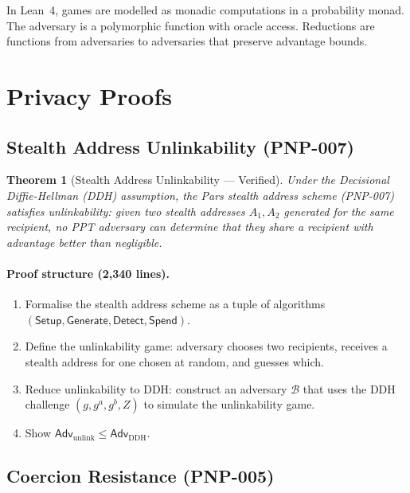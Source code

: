 \documentclass[11pt,a4paper]{article}
\newtheorem{theorem}{Theorem}[section]
\begin{document}
In Lean~4, games are modelled as monadic computations in a probability
monad.  The adversary is a polymorphic function with oracle access.
Reductions are functions from adversaries to adversaries that preserve
advantage bounds.

\section{Privacy Proofs}
\label{sec:privacy}

\subsection{Stealth Address Unlinkability (PNP-007)}

\begin{theorem}[Stealth Address Unlinkability --- Verified]
\label{thm:stealth}
    Under the Decisional Diffie-Hellman (DDH) assumption, the Pars
    stealth address scheme (PNP-007) satisfies unlinkability: given
    two stealth addresses $A_1, A_2$ generated for the same recipient,
    no PPT adversary can determine that they share a recipient with
    advantage better than negligible.
\end{theorem}

\paragraph{Proof structure (2{,}340 lines).}
\begin{enumerate}
    \item Formalise the stealth address scheme as a tuple of algorithms
    $(\mathsf{Setup}, \mathsf{Generate}, \mathsf{Detect}, \mathsf{Spend})$.
    \item Define the unlinkability game: adversary chooses two
    recipients, receives a stealth address for one chosen at random,
    and guesses which.
    \item Reduce unlinkability to DDH: construct an adversary $\mathcal{B}$
    that uses the DDH challenge $(g, g^a, g^b, Z)$ to simulate the
    unlinkability game.
    \item Show $\mathsf{Adv}_{\mathrm{unlink}} \leq
    \mathsf{Adv}_{\mathrm{DDH}}$.
\end{enumerate}

\subsection{Coercion Resistance (PNP-005)}
\end{document}
